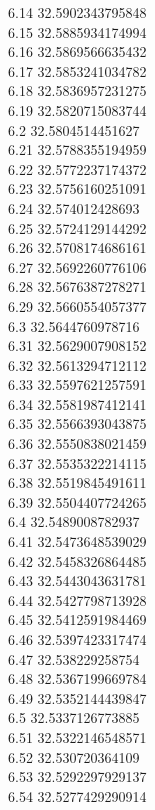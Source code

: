 {6.14	32.5902343795848\\
6.15	32.5885934174994\\
6.16	32.5869566635432\\
6.17	32.5853241034782\\
6.18	32.5836957231275\\
6.19	32.5820715083744\\
6.2	32.5804514451627\\
6.21	32.5788355194959\\
6.22	32.5772237174372\\
6.23	32.5756160251091\\
6.24	32.574012428693\\
6.25	32.5724129144292\\
6.26	32.5708174686161\\
6.27	32.5692260776106\\
6.28	32.5676387278271\\
6.29	32.5660554057377\\
6.3	32.5644760978716\\
6.31	32.5629007908152\\
6.32	32.5613294712112\\
6.33	32.5597621257591\\
6.34	32.5581987412141\\
6.35	32.5566393043875\\
6.36	32.5550838021459\\
6.37	32.5535322214115\\
6.38	32.5519845491611\\
6.39	32.5504407724265\\
6.4	32.5489008782937\\
6.41	32.5473648539029\\
6.42	32.5458326864485\\
6.43	32.5443043631781\\
6.44	32.5427798713928\\
6.45	32.5412591984469\\
6.46	32.5397423317474\\
6.47	32.538229258754\\
6.48	32.5367199669784\\
6.49	32.5352144439847\\
6.5	32.5337126773885\\
6.51	32.5322146548571\\
6.52	32.530720364109\\
6.53	32.5292297929137\\
6.54	32.5277429290914\\
}
